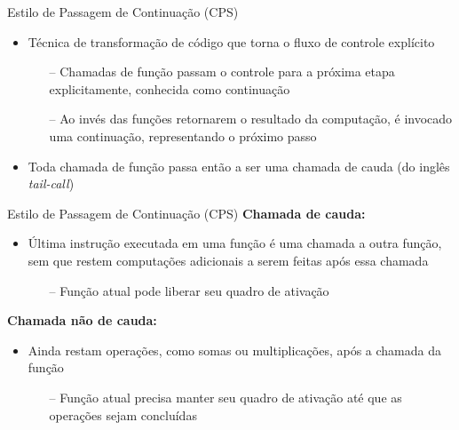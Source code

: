 \begin{frame}{Estilo de Passagem de Continuação (CPS)}
    \begin{itemize}
        \item Técnica de transformação de código que torna o fluxo de controle explícito
              \begin{itemize}
                  \item[--] Chamadas de função passam o controle para a próxima etapa explicitamente, conhecida como continuação~\cite{appel1992compiling}
                  \item[--] Ao invés das funções retornarem o resultado da computação, é invocado uma continuação, representando o próximo passo
              \end{itemize}
        \item Toda chamada de função passa então a ser uma chamada de cauda (do inglês \textit{tail-call})
    \end{itemize}
\end{frame}

\begin{frame}{Estilo de Passagem de Continuação (CPS)}
    \textbf{Chamada de cauda:}
    \begin{itemize}
        \item Última instrução executada em uma função é uma chamada a outra função, sem que restem computações adicionais a serem feitas após essa chamada~\cite{MUCHNICK1997}
              \begin{itemize}
                  \item[--] Função atual pode liberar seu quadro de ativação
              \end{itemize}
    \end{itemize}
    \textbf{Chamada não de cauda:}
    \begin{itemize}
        \item Ainda restam operações, como somas ou multiplicações, após a chamada da função
              \begin{itemize}
                  \item[--] Função atual precisa manter seu quadro de ativação até que as operações sejam concluídas
              \end{itemize}
    \end{itemize}
\end{frame}

